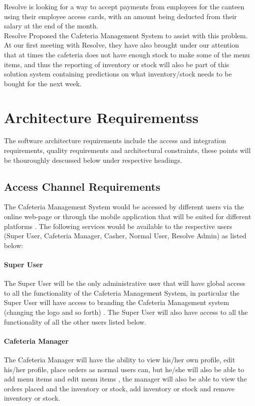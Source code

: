 \documentclass[12pt]{article}
\begin{document}
Resolve is looking for a way to accept payments from employees for the canteen
using their employee access cards, with an amount being deducted from their salary at the end of the month.\\

Resolve Proposed the Cafeteria Management System to assist with this problem.
At our first meeting with Resolve, they have also brought under our attention that at times the cafeteria does not have enough stock to make some of the menu items, and thus the reporting of inventory or stock will also be part of this solution system containing predictions on what inventory/stock needs to be bought for the next week.

\section{Architecture Requirementss}
The software architecture requirements include the access and integration requirements, quality
requirements and architectural constraints, these points will be thouroughly descussed below under respective headings.

\subsection{Access Channel Requirements}
The Cafeteria Management System would be accessed by different users via  the online web-page or through the mobile application that will be suited for different platforms . The following services would be available to the respective users (Super User, Cafeteria Manager, Casher, Normal User, Resolve Admin) as listed below: \\

\paragraph{Super User\\}
The Super User will be the only administrative user that will have global access to all the functionality of the Cafeteria Management System, in particular the Super User will have access to branding the Cafeteria Management system (changing the logo and so forth) . The Super User will also have access to all the functionality of all the other users listed below.

\paragraph{ Cafeteria Manager\\}
The Cafeteria Manager will have the ability to view his/her own profile, edit his/her profile,   place orders as normal users can, but he/she will also be able to add menu items and edit menu items , the manager will also be able to view the orders placed and the inventory or stock, add inventory or stock and remove inventory or stock.
\end{document}
